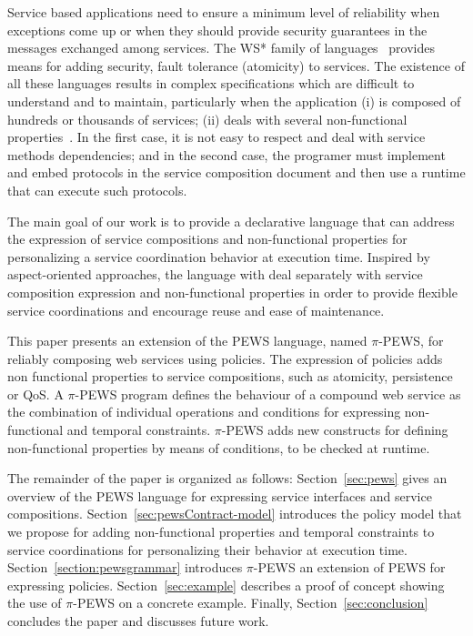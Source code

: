 \documentclass{sig-alternate}
\begin{document}
Service based applications need to ensure a minimum level of reliability when exceptions come up or when they should provide security guarantees in the messages exchanged among services. 
The WS* family of languages~\cite{W3C} provides means for adding security, fault tolerance (atomicity) to services. 
The existence of all these languages results in complex specifications which are difficult to understand and to maintain, particularly when the application (i)  is composed of hundreds or thousands of services; (ii) deals with several non-functional properties~\cite{Dustdar05}. In the first case, it is not easy to respect and deal with service methods dependencies; and in the second case, the programer must implement and embed protocols in the service composition document and then use a runtime that can execute such protocols. 
 
The main goal of our work is to provide a declarative language that can address the expression of service compositions and non-functional properties for personalizing a service coordination behavior at execution time. 
Inspired by aspect-oriented approaches, the language with deal separately with service composition expression and non-functional properties in order to provide flexible service coordinations and encourage reuse and ease of maintenance.

This paper presents an extension of  the PEWS language, named $\pi$-PEWS, for reliably composing web services using policies. 
The expression of policies adds non functional properties to service compositions, such as atomicity, persistence or QoS.  
A $\pi$-PEWS program defines the  behaviour of a compound web service as the combination of individual operations and conditions for expressing non-functional and temporal constraints. 
$\pi$-PEWS adds new constructs for defining non-functional properties by means of conditions, to be checked at runtime. 

The remainder of the paper is organized as follows: Section~\ref{sec:pews} gives an overview of the PEWS language for expressing service interfaces and service compositions.
Section~\ref{sec:pewsContract-model} introduces the policy model that we propose for adding  non-functional properties and temporal constraints to service coordinations for personalizing  their behavior at execution time. 
Section~\ref{section:pewsgrammar} introduces $\pi$-PEWS an extension of PEWS for expressing policies. 
Section~\ref{sec:example}   describes a proof of concept showing the use of $\pi$-PEWS on a concrete example. 
Finally, Section~\ref{sec:conclusion} concludes the paper and discusses future work.
\end{document}
